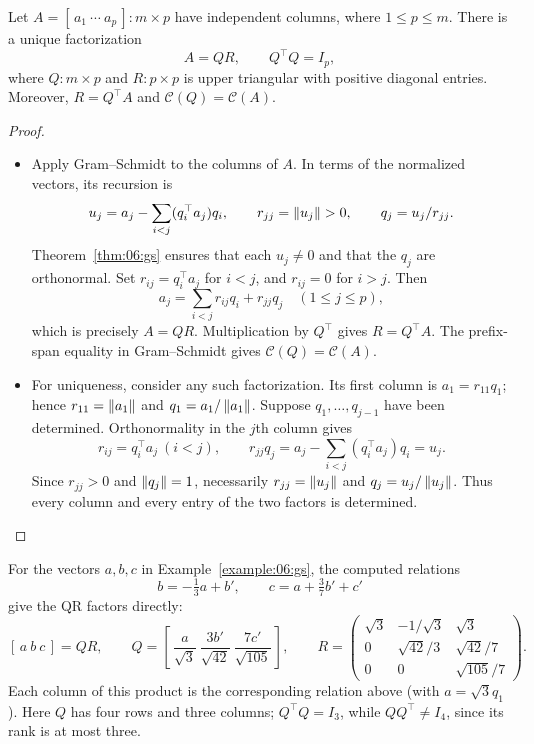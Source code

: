 \begin{theorem}\label{thm:06:qr}
Let \(A=[\,a_1\ \cdots\ a_p\,]:m\times p\) have independent columns,
where \(1\leqslant p\leqslant m\). There is a unique factorization
\[
A=QR,\qquad Q^\top Q=I_p,
\]
where \(Q:m\times p\) and \(R:p\times p\) is upper triangular with
positive diagonal entries. Moreover, \(R=Q^\top A\) and
\(\mathcal C(Q)=\mathcal C(A)\).
\end{theorem}
\begin{proof}
\begin{itemize}
\item Apply Gram--Schmidt to the columns of \(A\). In terms of the
  normalized vectors, its recursion is
  \[
  u_j=a_j-\sum_{i<j}(q_i^\top a_j)q_i,\qquad
  r_{jj}=\left\lVert u_j\right\rVert>0,\qquad q_j=u_j/r_{jj}.
  \]
  Theorem~\ref{thm:06:gs} ensures that each \(u_j\ne0\) and that
  the \(q_j\) are orthonormal. Set \(r_{ij}=q_i^\top a_j\) for
  \(i<j\), and \(r_{ij}=0\) for \(i>j\). Then
  \[
  a_j=\sum_{i<j}r_{ij}q_i+r_{jj}q_j
  \quad(1\leqslant j\leqslant p),
  \]
  which is precisely \(A=QR\). Multiplication by \(Q^\top\) gives
  \(R=Q^\top A\). The prefix-span equality in Gram--Schmidt gives
  \(\mathcal C(Q)=\mathcal C(A)\).
\item For uniqueness, consider any such factorization. Its first column
  is \(a_1=r_{11}q_1\); hence \(r_{11}=\left\lVert a_1\right\rVert\) and
  \(q_1=a_1/\left\lVert a_1\right\rVert\). Suppose \(q_1,\ldots,q_{j-1}\) have been
  determined. Orthonormality in the \(j\)th column gives
  \[
  r_{ij}=q_i^\top a_j\ (i<j),\qquad
  r_{jj}q_j=a_j-\sum_{i<j}(q_i^\top a_j)q_i=u_j.
  \]
  Since \(r_{jj}>0\) and \(\left\lVert q_j\right\rVert=1\), necessarily
  \(r_{jj}=\left\lVert u_j\right\rVert\) and \(q_j=u_j/\left\lVert u_j\right\rVert\).
  Thus every column and every entry of the two factors is determined.
\end{itemize}
\end{proof}

For the vectors \(a,b,c\) in
Example~\ref{example:06:gs}, the computed relations
\[
b=-\tfrac13a+b',\qquad c=a+\tfrac37b'+c'
\]
give the QR factors directly:
\[
[\,a\ b\ c\,]=QR,\qquad
Q=\left[\,\frac{a}{\sqrt3}\ \frac{3b'}{\sqrt{42}}\
  \frac{7c'}{\sqrt{105}}\,\right],\qquad
R=\begin{pmatrix}
\sqrt3&-1/\sqrt3&\sqrt3\\
0&\sqrt{42}/3&\sqrt{42}/7\\
0&0&\sqrt{105}/7
\end{pmatrix}.
\]
Each column of this product is the corresponding relation above
(with \(a=\sqrt3q_1\)). Here \(Q\) has four rows and three columns;
\(Q^\top Q=I_3\), while \(QQ^\top\ne I_4\), since its rank is at most three.

